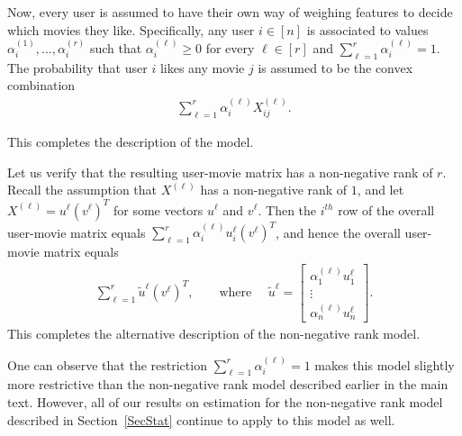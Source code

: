 \documentclass[11pt, hidelinks]{article} %
\newcommand{\numrows}{n}
\newcommand{\nnrank}{r}
\newcommand{\lowLeftVec}[1]{u^{#1}}
\newcommand{\lowRightVec}[1]{v^{#1}}
\newcommand{\lowLeftVecTilde}[1]{\widetilde{u}^{#1}}
\begin{document}
Now, every user is assumed to have their own way of weighing
features to decide which movies they like. Specifically, any user
$i \in [\numrows]$ is associated to values
$\alpha_i^{(1)},\ldots,\alpha_i^{(\nnrank)}$ such that
$\alpha_i^{(\ell)} \geq 0$ for every $\ell \in [\nnrank]$ and
$\sum_{\ell=1}^{\nnrank} \alpha_i^{(\ell)} = 1$. The probability that
user $i$ likes any movie $j$ is assumed to be the convex combination
\begin{align*}
\sum_{\ell=1}^{\nnrank} \alpha_i^{(\ell)} X^{(\ell)}_{ij}.
\end{align*}

This completes the description of the model. 

Let us verify that the
resulting user-movie matrix has a non-negative rank of $\nnrank$. Recall the assumption that $X^{(\ell)}$ has a non-negative
rank of $1$, and let $X^{(\ell)} = \lowLeftVec{\ell}
(\lowRightVec{\ell})^T$ for some vectors $\lowLeftVec{\ell}$ and
$\lowRightVec{\ell}$. Then the $i^{th}$ row of the overall user-movie
matrix equals \mbox{$\sum_{\ell=1}^{\nnrank} \alpha_i^{(\ell)}
  \lowLeftVec{\ell}_i (\lowRightVec{\ell})^T$}, and hence the overall
user-movie matrix equals
\begin{align*}
\sum_{\ell=1}^{\nnrank} \lowLeftVecTilde{\ell} (\lowRightVec{\ell})^T,
\qquad \mbox{where } \quad \lowLeftVecTilde{\ell} =
\begin{bmatrix}
\alpha_1^{(\ell)} \lowLeftVec{\ell}_1 \\
\vdots \\
\alpha_\numrows^{(\ell)} \lowLeftVec{\ell}_\numrows
\end{bmatrix}.
\end{align*}
This completes the alternative description of the non-negative rank
model.

One can observe that the restriction $\sum_{\ell=1}^{\nnrank}
\alpha_i^{(\ell)} = 1$ makes this model slightly more restrictive than
the non-negative rank model described earlier in the main
text. However, all of our results on
estimation for the non-negative rank model described in Section~\ref{SecStat} continue to apply to this
model as well.



\let\oldbibliography\thebibliography
\renewcommand{\thebibliography}[1]{\oldbibliography{#1}
	\setlength{\itemsep}{0pt}}

 

\end{document}
